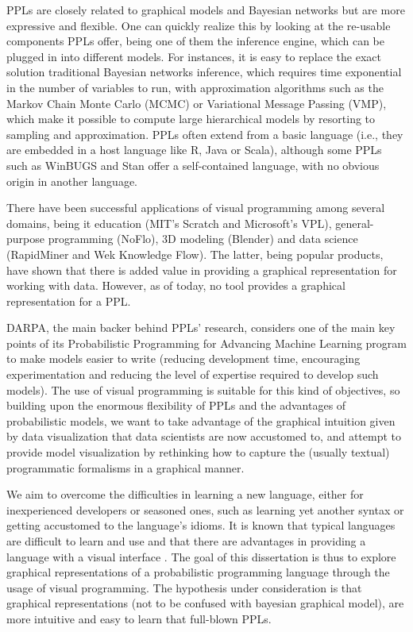 PPLs are closely related to graphical models and Bayesian networks but are
more expressive and flexible. One can quickly realize this by looking at the
re-usable components PPLs offer, being one of them the inference engine, which
can be plugged in into different models. For instances, it is easy to replace
the exact solution traditional Bayesian networks inference, which requires time
exponential in the number of variables to run, with approximation algorithms
such as the Markov Chain Monte Carlo (MCMC) or Variational Message Passing
(VMP), which make it possible to compute large hierarchical models by resorting
to sampling and approximation. PPLs often extend from a basic language (i.e.,
they are embedded in a host language like R, Java or Scala), although some PPLs
such as WinBUGS and Stan offer a self-contained language, with no obvious origin
in another language.

There have been successful applications of visual programming among several
domains, being it education (MIT’s Scratch and Microsoft’s VPL), general-purpose
programming (NoFlo), 3D modeling (Blender) and data science (RapidMiner and Wek
 Knowledge Flow). The latter, being popular products, have shown that there is
 added value in providing a graphical representation for working with data.
 However, as of today, no tool provides a graphical representation for a PPL.

DARPA, the main backer behind PPLs’ research, considers one of the main key
points of its Probabilistic Programming for Advancing Machine Learning program
to make models easier to write (reducing development time, encouraging
experimentation and reducing the level of expertise required to develop such
models). The use of visual programming is suitable for this kind of objectives,
so building upon the enormous flexibility of PPLs and the advantages of
probabilistic models, we want to take advantage of the graphical intuition given
by data visualization that data scientists are now accustomed to, and attempt
to provide model visualization by rethinking how to capture
the (usually textual) programmatic formalisms in a graphical manner.

We aim to overcome
the difficulties in learning a new language, either for inexperienced developers or seasoned
ones, such as learning yet another syntax or getting accustomed to the language’s idioms. It is
known that typical languages are difficult to learn and use \cite{Lewis1987} and that there are advantages in
providing a language with a visual interface \cite{dfbeg}.
The goal of this dissertation is thus to explore graphical representations of a
probabilistic programming language through the usage of visual programming.
The hypothesis under consideration is that graphical representations (not to be
confused with bayesian graphical model), are more intuitive and easy to learn
that full-blown PPLs.

